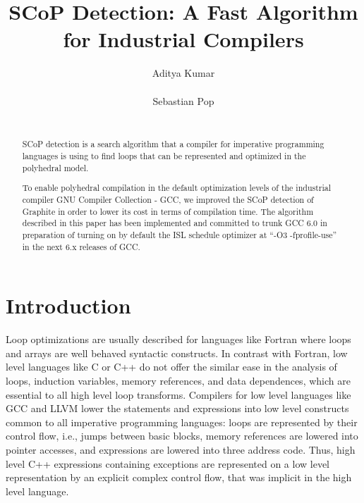 \documentclass{sig-alternate}
\begin{document}
\setlength{\pdfpageheight}{\paperheight}
\setlength{\pdfpagewidth}{\paperwidth}

\title{SCoP Detection: A Fast Algorithm for Industrial Compilers}


\author{
\alignauthor
Aditya Kumar\\
       \\
\alignauthor
Sebastian Pop\\
       \\
}

\maketitle

\begin{abstract}
SCoP detection is a search algorithm that a compiler for imperative programming
languages is using to find loops that can be represented and optimized in the
polyhedral model.

To enable polyhedral compilation in the default optimization levels of the
industrial compiler GNU Compiler Collection - GCC, we improved the SCoP
detection of Graphite in order to lower its cost in terms of compilation time.
The algorithm described in this paper has been implemented and committed to
trunk GCC 6.0 in preparation of turning on by default the ISL schedule optimizer
at ``-O3 -fprofile-use'' in the next 6.x releases of GCC.
\end{abstract}

\section{Introduction}

Loop optimizations are usually described for languages like Fortran where loops
and arrays are well behaved syntactic constructs.  In contrast with Fortran, low
level languages like C or C++ do not offer the similar ease in the analysis of
loops, induction variables, memory references, and data dependences, which are
essential to all high level loop transforms.  Compilers for low level languages
like GCC and LLVM lower the statements and expressions into low level constructs
common to all imperative programming languages: loops are represented by their
control flow, i.e., jumps between basic blocks, memory references are lowered
into pointer accesses, and expressions are lowered into three address code.
Thus, high level C++ expressions containing exceptions are represented on a low
level representation by an explicit complex control flow, that was implicit in
the high level language.
\end{document}
